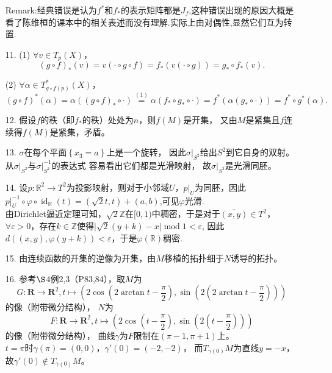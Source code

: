 \begin{itemize}
    Remark:经典错误是认为$f^*$和$f_*$的表示矩阵都是$J_f$,这种错误出现的原因大概是看了陈维桓的课本中的相关表述而没有理解.实际上由对偶性,显然它们互为转置.

    \item[11.]
    (1) $\forall v\in T_p(X)$，
    \[
        (g\circ f)_*(v)=v(\cdot\circ g\circ f)
        =f_*(v(\cdot\circ g))=g_*\circ f_*(v).
    \]

    (2) $\forall \alpha\in T_{g\circ f(p)}^*(X)$，
    \[
        (g\circ f)^*(\alpha)=\alpha((g\circ f)_*\circ\cdot)
        \overset{(1)}{=}\alpha(f_*\circ g_*\circ\cdot)
        =f^*(\alpha(g_*\circ\cdot))=f^*\circ g^*(\alpha).
    \]

    \item[12.]
    假设$f$的秩（即$f_*$的秩）处处为$n$，则$f(M)$是开集，
    又由$M$是紧集且$f$连续得$f(M)$是紧集，矛盾。

    \item[13.]
    $\sigma$在每个平面$\left\{x_3=a\right\}$上是一个旋转，
    因此$\sigma|_{S^2}$给出$S^2$到它自身的双射。\\
    从$\sigma|_{S^2}$与$\sigma|_{S^2}^{-1}$的表达式
    容易看出它们都是光滑映射，
    故$\sigma|_{S^2}$是光滑同胚。
    \item[14.]
    设$p:\mathbb{R}^2\rightarrow T^2$为投影映射，则对于小邻域$U$，$p|_U$为同胚，因此$p|_U^{-1}\circ \varphi \circ \operatorname{id}_{\mathbb{R}}(t)=(\sqrt{2}t,t)+(a,b)$,可见$\varphi $光滑.\\
    由Dirichlet逼近定理可知，$\sqrt{2}\mathbb{Z}$在$[0,1)$中稠密，于是对于$\overline{(x,y)}\in T^2$，$\forall \varepsilon>0$，存在$k\in\mathbb{Z}$使得$\vert \sqrt{2}(y+k)-x\vert \operatorname{mod}1<\varepsilon$, 因此$d((x,y),\varphi(y+k))<\varepsilon$，于是$\varphi(\mathbb{R})$稠密.

    \item[15.]
    由连续函数的开集的逆像为开集，由$M$移植的拓扑细于$N$诱导的拓扑。
    
    \item[16.]
    参考$\S$4例2,3（P83,84），取$M$为
    \[G:\mathbf{R} \rightarrow \mathbf{R}^2,
    t \mapsto (2\cos(2\operatorname{arctan}t-\frac{\pi}{2}),\sin(2(2\operatorname{arctan}t-\frac{\pi}{2})))\]
    的像（附带微分结构），
    $N$为
    \[F:\mathbf{R} \rightarrow \mathbf{R}^2,t \mapsto (2\cos(t-\frac{\pi}{2}),\sin(2(t-\frac{\pi}{2})))\]
    的像（附带微分结构），
    曲线$\gamma$为$F$限制在$(\pi-1,\pi+1)$上。\\
    $t=\pi$时$\gamma(\pi)=(0,0)$，$\gamma'(0)=(-2,-2)$，
    而$T_{\gamma(0)}M$为直线$y=-x$，故$\gamma'(0)\notin T_{\gamma(0)}M$。
    

\end{itemize}
